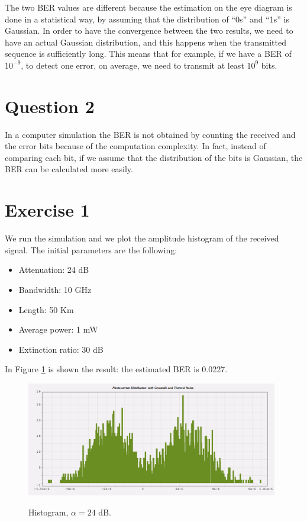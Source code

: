 \documentclass[a4paper,10pt]{report}
\begin{document}
The two BER values are different because the estimation on the eye diagram is done in a statistical way, by assuming that the distribution
of ``0s'' and ``1s'' is Gaussian.
In order to have the convergence between the two results, we need to have an actual Gaussian distribution, and this happens when the transmitted
sequence is sufficiently long. This means that for example, if we have a BER of $10^{-9}$, to detect one error, on average,
we need to transmit at least $10^{9}$ bits.

\section*{Question 2}
In a computer simulation the BER is not obtained by counting the received and the error bits because of the computation complexity.
In fact, instead of comparing each bit, if we assume that the distribution of the bits is Gaussian, the BER can be calculated more easily.

\section*{Exercise 1}
We run the simulation and we plot the amplitude histogram of the received signal.
The initial parameters are the following:
\begin{itemize}
 \item Attenuation: 24 dB
 \item Bandwidth: 10 GHz
 \item Length: 50 Km
 \item Average power: 1 mW
 \item Extinction ratio: 30 dB
\end{itemize}

In Figure \ref{ex1_1} is shown the result: the estimated BER is 0.0227.
\begin{figure}[!ht]
   \centering
   \includegraphics[width=11cm]{ex1_1.png}\\
   \caption{Histogram, $\alpha = 24$ dB.}
   \label{ex1_1}
\end{figure}
\end{document}
